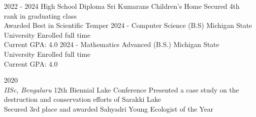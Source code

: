 \documentclass[9pt]{developercv} %
\begin{document}
\vspace{-10 pt}
\begin{entrylist}
    \entry
		{2022 - 2024}
		{High School Diploma}
		{Sri Kumarans Children's Home}
		{Secured 4th rank in graduating class \\ Awarded Best in Scientific Temper}
    \entry
		{2024 - }
		{Computer Science (B.S)}
		{Michigan State University}
		{Enrolled full time \\ 
		Current GPA: 4.0}
	\entry
		{2024 - }
		{Mathematics Advanced (B.S.)}
		{Michigan State University}
		{Enrolled full time \\ 
		Current GPA: 4.0}

\end{entrylist}
\begin{entrylist}
	\entry
		{2020 \\ \vspace{4pt}\color{gray} \textit{IISc, Bengaluru}}
		{12th Biennial Lake Conference}
		{}
		{Presented a case study on the destruction and conservation efforts of Sarakki Lake\\ 
		Secured 3rd place and awarded Sahyadri Young Ecologist of the Year}
\end{entrylist}
\end{document}
